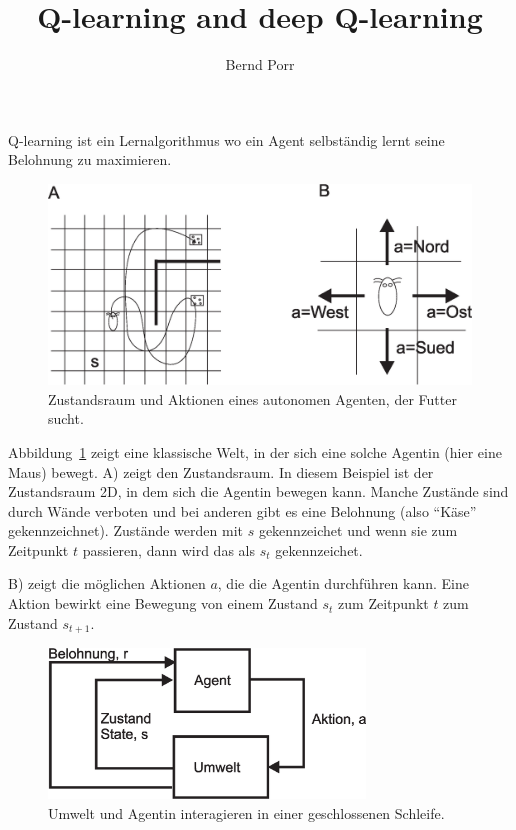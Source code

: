 \documentclass[12pt]{report}
\author{Bernd Porr}
\title{Q-learning and deep Q-learning}
\begin{document}
\maketitle

Q-learning ist ein Lernalgorithmus wo ein Agent selbständig
lernt seine Belohnung zu maximieren.

\begin{figure}[!hbt]
\begin{center}
\mbox{\includegraphics[width=\textwidth]{state_action}}
\end{center}
\caption{Zustandsraum und Aktionen eines autonomen Agenten,
  der Futter sucht.
\label{state_action}}
\end{figure}

Abbildung~\ref{state_action} zeigt eine klassische Welt, in der sich
eine solche Agentin (hier eine Maus) bewegt.  A) zeigt den
Zustandsraum. In diesem Beispiel ist der Zustandsraum 2D, in dem sich
die Agentin bewegen kann. Manche Zustände sind durch Wände verboten und
bei anderen gibt es eine Belohnung (also ``Käse'' gekennzeichnet).
Zustände werden mit $s$ gekennzeichet und wenn sie zum Zeitpunkt
$t$ passieren, dann wird das als $s_t$ gekennzeichet.

B) zeigt die möglichen Aktionen $a$, die die Agentin durchführen kann.
Eine Aktion bewirkt eine Bewegung von einem Zustand $s_t$ zum Zeitpunkt
$t$ zum Zustand $s_{t+1}$. 

\begin{figure}[!hbt]
\begin{center}
\mbox{\includegraphics[width=0.75\textwidth]{schleife}}
\end{center}
\caption{Umwelt und Agentin interagieren in einer geschlossenen
  Schleife.
\label{schleife}}
\end{figure}
\end{document}
